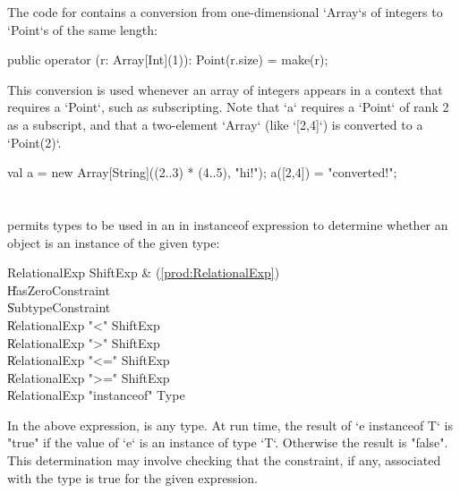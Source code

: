 \begin{ex}
The code for  contains a conversion from 
one-dimensional \xcd`Array`s of integers to \xcd`Point`s of the same length: 
\begin{xten}
  public operator (r: Array[Int](1)): Point(r.size) 
         = make(r);
\end{xten}
This conversion is used whenever an array of integers appears in a 
context that requires a \xcd`Point`, such as subscripting. Note 
that \xcd`a` requires a \xcd`Point` of rank 2 as a subscript, and that 
a two-element \xcd`Array` (like \xcd`[2,4]`) is converted to a 
\xcd`Point(2)`.
% 
\begin{xten}
val a = new Array[String]((2..3) * (4..5), "hi!");
a([2,4]) = "converted!";
\end{xten}


\end{ex}



\section{}
\label{instanceOf}

\Xten{} permits types to be used in an in instanceof expression
to determine whether an object is an instance of the given type:

\begin{bbgrammar}
       RelationalExp \: ShiftExp & (\ref{prod:RelationalExp}) \\
                     \| HasZeroConstraint \\
                     \| SubtypeConstraint \\
                     \| RelationalExp \xcd"<" ShiftExp \\
                     \| RelationalExp \xcd">" ShiftExp \\
                     \| RelationalExp \xcd"<=" ShiftExp \\
                     \| RelationalExp \xcd">=" ShiftExp \\
                     \| RelationalExp \xcd"instanceof" Type \\
\end{bbgrammar}

In the above expression,  is any type. At run time, the
result of \xcd`e instanceof T`
is \xcd"true" if the
value of \xcd`e` is an instance of type \xcd`T`.
Otherwise the result is \xcd"false". This determination may involve checking
that the constraint, if any, associated with the type is true for the given
expression.

